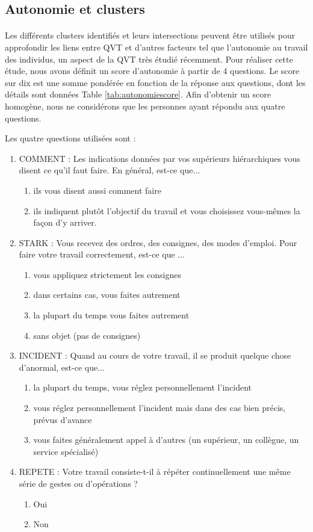 \documentclass[11pt,fleqn,openany,frenchb]{book} %
\begin{document}
\subsection{Autonomie et clusters}
\paragraph{}
Les différents clusters identifiés et leurs intersections peuvent être utilisés pour approfondir les liens entre QVT et d'autres facteurs tel que l'autonomie au travail des individus, un aspect de la QVT très étudié récemment.
Pour réaliser cette étude, nous avons définit un score d'autonomie à partir de 4 questions. Le score sur dix est une somme pondérée en fonction de la réponse aux questions, dont les détails sont données Table \ref{tab:autonomiescore}. Afin d'obtenir un score homogène, nous ne considérons que les personnes ayant répondu aux quatre questions. 

Les quatre questions utilisées sont : 
\begin{enumerate}
\item COMMENT : Les indications données par vos supérieurs hiérarchiques vous disent ce qu'il faut faire. En général, est-ce que...
    \begin{enumerate}
    \item ils vous disent aussi comment faire
    \item ils indiquent plutôt l'objectif du travail et vous choisissez vous-mêmes la façon d'y arriver.
    \end{enumerate}
\item STARK : Vous recevez des ordres, des consignes, des modes d'emploi. Pour faire votre travail correctement, est-ce que ...
    \begin{enumerate}
    \item  vous appliquez strictement les consignes
    \item dans certains cas, vous faites autrement
    \item la plupart du temps vous faites autrement
    \item sans objet (pas de consignes)
    \end{enumerate}
\item INCIDENT : Quand au cours de votre travail, il se produit quelque chose d'anormal, est-ce que...
    \begin{enumerate}
    \item la plupart du temps, vous réglez personnellement l'incident
    \item vous réglez personnellement l’incident mais dans des cas bien précis, prévus
    d’avance
    \item vous faites généralement appel à d'autres (un supérieur, un collègue, un service
    spécialisé)
    \end{enumerate}
\item REPETE : Votre travail consiste-t-il à répéter continuellement une même série de gestes ou d'opérations ?
    \begin{enumerate}
    \item Oui
    \item Non
    \end{enumerate}
\end{enumerate}
\end{document}

